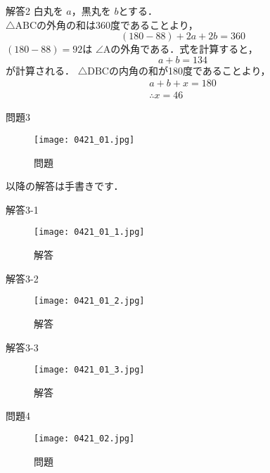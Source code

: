 \documentclass[dvipdfmx]{beamer}
\begin{document}
	\begin{frame}{解答2}
		白丸を $a$，黒丸を $b$とする．\\
		$\triangle\mathrm{ABC}$の外角の和は360度であることより，
		\[(180-88)+2a+2b=360\]
		$(180-88)=92$は $\angle\mathrm{A}$の外角である．式を計算すると，
		\[a+b = 134\]
		が計算される．
		$\triangle\mathrm{DBC}$の内角の和が180度であることより，
		\begin{gather*}
			a+b+x = 180\\
			\therefore x = 46
		\end{gather*}
	\end{frame}
	
	\begin{frame}{問題3}
		\begin{figure}[htbp]
			\centering
			\texttt{[image: 0421\_01.jpg]}
			\caption{問題}
			\label{jpg:0421_01}
		\end{figure}

		以降の解答は手書きです．

	\end{frame}

	\begin{frame}{解答3-1}

		\begin{figure}[htbp]
			\centering
			\texttt{[image: 0421\_01\_1.jpg]}
			\caption{解答}
			\label{jpg:0421_01_1}
		\end{figure}

	\end{frame}

	\begin{frame}{解答3-2}
		\begin{figure}[htbp]
			\centering
			\texttt{[image: 0421\_01\_2.jpg]}
			\caption{解答}
			\label{jpg:0421_01_2}
		\end{figure}
	\end{frame}

	\begin{frame}{解答3-3}
		\begin{figure}[htbp]
			\centering
			\texttt{[image: 0421\_01\_3.jpg]}
			\caption{解答}
			\label{jpg:0421_01_3}
		\end{figure}
	\end{frame}



	\begin{frame}{問題4}
		\begin{figure}[htbp]
			\centering
			\texttt{[image: 0421\_02.jpg]}
			\caption{問題}
			\label{jpg:0421_02}
		\end{figure}


	\end{frame}
\end{document}

